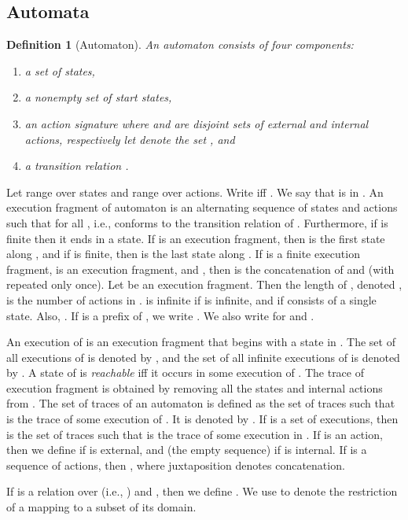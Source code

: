 \documentclass[11pt]{article}
\newcommand{\bn}{\begin{enumerate}}
\newcommand{\en}{\end{enumerate}}
\newcommand{\bd}{\begin{definition}}
\newcommand{\ed}{\end{definition}}
\newtheorem{definition}{Definition}
\begin{document}
\subsection{Automata}
\label{sec:automata}

\bd[Automaton]
An \emph{automaton}  consists of four components:
\bn
\item a set  of states,
\item a nonempty set  of start states,
\item an action signature  where
 and  are disjoint sets of external and internal
actions, respectively let  denote the set , and
\item a transition relation .
\label{def:automaton}
\en
\ed

Let  range over states and  range over
actions. Write  iff . We say
that  is  in .  An execution fragment  of
automaton  is
an alternating sequence of states and actions  such that  for all , i.e.,  conforms to the
transition relation of . Furthermore, if  is finite then it
ends in a state. 
If  is an execution fragment, then
 is the first state along , and if 
 is finite, then
 is the last state along .
If  is a
finite execution fragment,  is an execution fragment, and
, then  is the
concatenation of  and  (with  repeated
only once). 
Let  be an execution fragment. Then
the length of , denoted , is the number of actions in
.  is infinite if  is infinite, 
and  if  consists of a single state.
Also, .
If  is a prefix of , we write . We also
write  for  and .

An execution of  is an execution fragment that begins with a state
in . 
The set of all executions of  is denoted by , and
the set of all infinite executions of  is denoted by .
A state of  is \emph{reachable} iff it occurs in some execution of
.
The trace  of execution fragment  is obtained
by removing all the states and internal actions from .
The set of traces of an automaton  is defined as the set of traces
 such that  is the trace of some execution of .  It
is denoted by .
If  is a set of executions, then
 is the set of traces  such that  is the
trace of some execution in . 
If  is an action, then we define  if  is external, and
 (the empty sequence) if  is internal.
If  is a sequence of actions, then 
,
where juxtaposition denotes concatenation.

If  is a relation over  (i.e., ) and , then we define
.
We use  to denote the restriction of a mapping to a subset of its domain.
\end{document}
